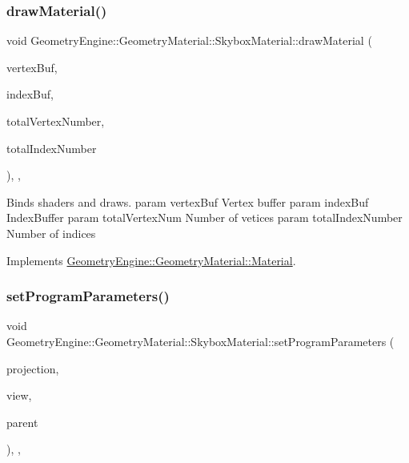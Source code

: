 \subsubsection{\texorpdfstring{drawMaterial()}{drawMaterial()}}
{\footnotesize\ttfamily void Geometry\+Engine\+::\+Geometry\+Material\+::\+Skybox\+Material\+::draw\+Material (\begin{DoxyParamCaption}\item[{Q\+Open\+G\+L\+Buffer $\ast$}]{vertex\+Buf,  }\item[{Q\+Open\+G\+L\+Buffer $\ast$}]{index\+Buf,  }\item[{unsigned int}]{total\+Vertex\+Number,  }\item[{unsigned int}]{total\+Index\+Number }\end{DoxyParamCaption})\hspace{0.3cm}{\ttfamily [override]}, {\ttfamily [protected]}, {\ttfamily [virtual]}}

Binds shaders and draws. param vertex\+Buf Vertex buffer param index\+Buf Index\+Buffer param total\+Vertex\+Num Number of vetices param total\+Index\+Number Number of indices 

Implements \mbox{\hyperlink{class_geometry_engine_1_1_geometry_material_1_1_material_a0070eab6e5fe86dc05dc69f2e37b9072}{Geometry\+Engine\+::\+Geometry\+Material\+::\+Material}}.

\mbox{\label{class_geometry_engine_1_1_geometry_material_1_1_skybox_material_a7760402d819462db205dadf3f370af73}} 
\subsubsection{\texorpdfstring{setProgramParameters()}{setProgramParameters()}}
{\footnotesize\ttfamily void Geometry\+Engine\+::\+Geometry\+Material\+::\+Skybox\+Material\+::set\+Program\+Parameters (\begin{DoxyParamCaption}\item[{const Q\+Matrix4x4 \&}]{projection,  }\item[{const Q\+Matrix4x4 \&}]{view,  }\item[{const \mbox{\hyperlink{class_geometry_engine_1_1_geometry_world_item_1_1_geometry_item_1_1_geometry_item}{Geometry\+World\+Item\+::\+Geometry\+Item\+::\+Geometry\+Item}} \&}]{parent }\end{DoxyParamCaption})\hspace{0.3cm}{\ttfamily [override]}, {\ttfamily [protected]}, {\ttfamily [virtual]}}

